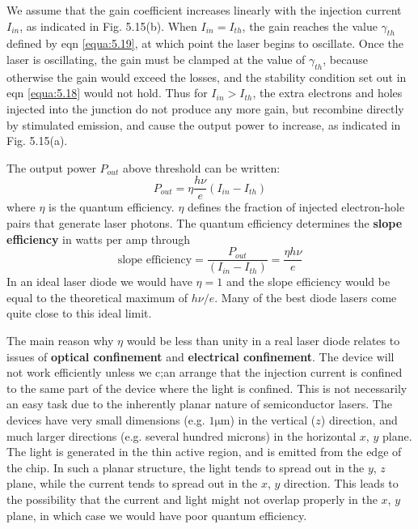 \documentclass[12pt]{book}
\begin{document}
We assume that the gain coefficient increases linearly with the injection current $I_{in}$, as indicated in Fig. 5.15(b). When $I_{in} = I_{th}$, the gain reaches the value $\gamma_{th}$ defined by eqn \ref{equa:5.19}, at which point the laser begins to oscillate. Once the laser is oscillating, the gain must be clamped at the value of $\gamma_{th}$, because otherwise the gain would exceed the losses, and the stability condition set out in eqn \ref{equa:5.18} would not hold. Thus for $I_{in} > I_{th}$, the extra electrons and holes injected into the junction do not produce any more gain, but recombine directly by stimulated emission, and cause the output power to increase, as indicated in Fig. 5.15(a).

The output power $P_{out}$ above threshold can be written:
\begin{equation}\label{equa:5.20}
  P_{out}=\eta\frac{h\nu}{e}(I_{in}-I_{th})
\end{equation}
where $\eta$ is the quantum efficiency. $\eta$ defines the fraction of injected electron-hole pairs that generate laser photons. The quantum efficiency determines the \textbf{slope efficiency} in watts per amp through
\begin{equation}\label{equa:5.21}
  \text{slope efficiency}=\frac{P_{out}}{(I_{in}-I_{th})}=\frac{\eta h\nu}{e}
\end{equation}
In an ideal laser diode we would have $\eta=1$ and the slope efficiency would be equal to the theoretical maximum of $h\nu/e$. Many of the best diode lasers come quite close to this ideal limit.

The main reason why $\eta$ would be less than unity in a real laser diode relates to issues of \textbf{optical confinement} and \textbf{electrical confinement}. The device will not work efficiently unless we c;an arrange that the injection current is confined to the same part of the device where the light is confined. This is not necessarily an easy task due to the inherently planar nature of semiconductor lasers. The devices have very small dimensions (e.g. $\mathrm{1\mu m}$) in the vertical ($z$) direction, and much larger directions (e.g. several hundred microns) in the horizontal $x$, $y$ plane. The light is generated in the thin active region, and is emitted from the edge of the chip. In such a planar structure, the light tends to spread out in the $y$, $z$ plane, while the current tends to spread out in the $x$, $y$ direction. This leads to the possibility that the current and light might not overlap properly in the $x$, $y$ plane, in which case we would have poor quantum efficiency.
\end{document}
